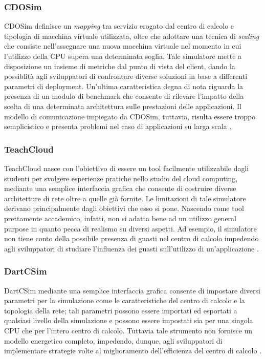 {\subsubsection*{CDOSim}
CDOSim \cite{fittkau2012cdosim} definisce un \emph{mapping} tra servizio erogato dal centro di calcolo e tipologia di macchina virtuale utilizzata, oltre che adottare una tecnica di \emph{scaling} che consiste nell'assegnare una nuova macchina virtuale nel momento in cui l'utilizzo della CPU supera una determinata soglia. Tale simulatore mette a disposizione un insieme di metriche dal punto di vista del client, dando la possiblità agli sviluppatori di confrontare diverse soluzioni in base a differenti parametri di deployment. Un'ultima caratteristica degna di nota riguarda la presenza di un modulo di benchmark che consente di rilevare l'impatto della scelta di una determinata architettura sulle prestazioni delle applicazioni. Il modello di comunicazione impiegato da CDOSim, tuttavia, risulta essere troppo semplicistico e presenta problemi nel caso di applicazioni su larga scala \cite{mansouri2020cloud}.  
\subsubsection*{TeachCloud}
TeachCloud \cite{jararweh2013teachcloud} nasce con l'obiettivo di essere un tool facilmente utilizzabile dagli studenti per svolgere esperienze pratiche nello studio del cloud computing, mediante una semplice interfaccia grafica che consente di costruire diverse architetture di rete oltre a quelle già fornite. Le limitazioni di tale simulatore derivano principalmente dagli obiettivi che esso si pone. Nascendo come tool prettamente accademico, infatti, non si adatta bene ad un utilizzo general purpose in quanto pecca di realismo su diversi aspetti. Ad esempio, il simulatore non tiene conto della possibile presenza di guasti nel centro di calcolo impedendo agli sviluppatori di studiare l'influenza dei guasti sull'utilizzo di un'applicazione \cite{mansouri2020cloud}. 
\subsubsection*{DartCSim}
DartCSim \cite{li2012dartcsim} mediante una semplice interfaccia grafica consente di impostare diversi parametri per la simulazione come le caratteristiche del centro di calcolo e la topologia della rete; tali parametri possono essere importati ed esportati a qualsiasi livello della simulazione e possono essere impostati sia per una singola CPU che per l'intero centro di calcolo. Tuttavia tale strumento non fornisce un modello energetico completo, impedendo, dunque, agli sviluppatori di implementare strategie volte al miglioramento dell'efficienza del centro di calcolo \cite{mansouri2020cloud}. 
}

